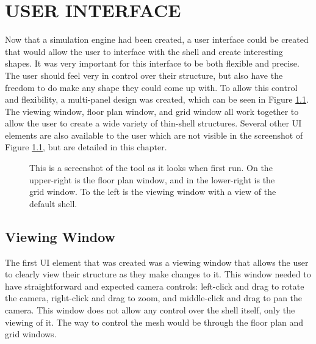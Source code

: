 \documentclass{thesis}
\begin{document}
\chapter{USER INTERFACE}
Now that a simulation engine had been created, a user interface could be created that would allow the user to interface with the
shell and create interesting shapes.  It was very important for this interface to be both flexible and precise.  The user should
feel very in control over their structure, but also have the freedom to do make any shape they could come up with.  To allow this
control and flexibility, a multi-panel design was created, which can be seen in Figure \ref{fig:basic}.  The viewing window,
floor plan window, and grid window all work together to allow the user to create a wide variety of thin-shell structures.  Several
other UI elements are also available to the user which are not visible in the screenshot of Figure \ref{fig:basic}, but are
detailed in this chapter.

\begin{figure}
\caption[The tool]{This is a screenshot of the tool as it looks when first run.  On the upper-right is the floor plan window, and
in the lower-right is the grid window.  To the left is the viewing window with a view of the default shell.}
\label{fig:basic}
\end{figure}

\section{Viewing Window}
The first UI element that was created was a viewing window that allows the user to clearly view their structure as they make changes
to it. This window needed to have straightforward and expected camera controls: left-click and drag to rotate the camera, right-click and
drag to zoom, and middle-click and drag to pan the camera.  This window does not allow any control over the shell itself, only the viewing
of it.  The way to control the mesh would be through the floor plan and grid windows.
\end{document}
